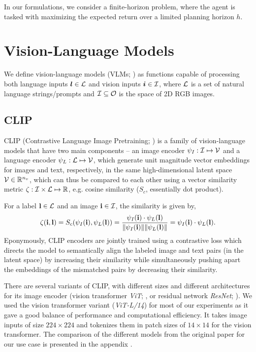 In our formulations, we consider a finite-horizon problem, where the agent is tasked with maximizing the expected return over a limited planning horizon \(h\).

\newpage
\section{Vision-Language Models}
\label{sec:vlms}

We define vision-language models (VLMs; \cite{vlmsurvey}) as functions capable of processing both language inputs \(\bm{l} \in \mathcal{L}\) and vision inputs \(\bm{i} \in \mathcal{I}\), where \(\mathcal{L}\) is a set of natural language strings/prompts and \(\mathcal{I} \subseteq \mathcal{O}\) is the space of 2D RGB images.

\subsection{CLIP}
\label{sec:clip}
CLIP (Contrastive Language Image Pretraining; \cite{clip}) is a family of vision-language models that have two main components -- an image encoder \(\psi_I: \mathcal{I} \mapsto \mathcal{V}\) and a language encoder \(\psi_L: \mathcal{L} \mapsto \mathcal{V}\), which generate unit magnitude vector embeddings for images and text, respectively, in the same high-dimensional latent space \(\mathcal{V} \in \mathbb{R}^{n_v}\), which can thus be compared to each other using a vector similarity metric \(\zeta: \mathcal{I} \times \mathcal{L} \mapsto \mathbb{R}\), e.g. cosine similarity (\(S_c\), essentially dot product).

For a label \(\mathbf{l} \in \mathcal{L}\) and an image \(\mathbf{i} \in \mathcal{I}\), the similarity is given by,
\begin{equation}
    \label{eq:clip-similarity}
    \zeta(\mathbf{i}, \mathbf{l}) = S_c(\psi_I(\mathbf{i}), \psi_L(\mathbf{l})) = \dfrac{\psi_I(\mathbf{i}) \cdot \psi_L(\mathbf{l})}{\| \psi_I(\mathbf{i}) \| \| \psi_L(\mathbf{l}) \|} = \psi_I(\mathbf{i}) \cdot \psi_L(\mathbf{l}).
\end{equation}
Eponymously, CLIP encoders are jointly trained using a contrastive loss which directs the model to semantically align the labeled image and text pairs (in the latent space) by increasing their similarity while simultaneously pushing apart the embeddings of the mismatched pairs by decreasing their similarity.

There are several variants of CLIP, with different sizes and different architectures for its image encoder (vision transformer \emph{ViT}; \cite{vit}, or residual network \emph{ResNet}; \cite{resnet}).
We used the vision transformer variant (\emph{ViT-L/14}) for most of our experiments as it gave a good balance of performance and computational efficiency.
It takes image inputs of size \(224 \times 224\) and tokenizes them in patch sizes of \(14 \times 14\) for the vision transformer.
The comparison of the different models from the original paper for our use case is presented in the appendix .

